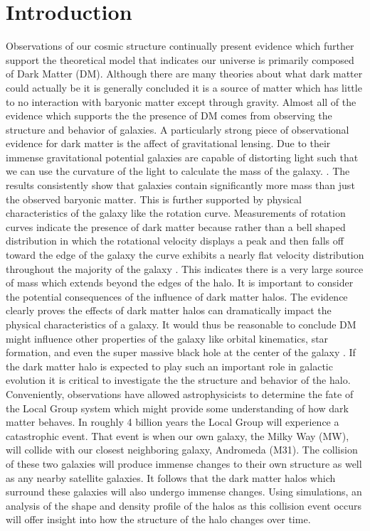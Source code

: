 \documentclass[usenatbib]{mnras}
\begin{document}
\section{Introduction}
Observations of our cosmic structure continually present evidence which further support the theoretical model that indicates our universe is primarily composed of Dark Matter (DM). Although there are many theories about what dark matter could actually be it is generally concluded it is a source of matter which has little to no interaction with baryonic matter except through gravity. Almost all of the evidence which supports the the presence of DM comes from observing the structure and behavior of galaxies. A particularly strong piece of observational evidence for dark matter is the affect of gravitational lensing. Due to their immense gravitational potential galaxies are capable of distorting light such that we can use the curvature of the light to calculate the mass of the galaxy. \citep{Massey_2010}. The results consistently show that galaxies contain significantly more mass than just the observed baryonic matter. This is further supported by physical characteristics of the galaxy like the rotation curve. Measurements of rotation curves indicate the presence of dark matter because rather than a bell shaped distribution in which the rotational velocity displays a peak and then falls off toward the edge of the galaxy the curve exhibits a nearly flat velocity distribution throughout the majority of the galaxy \citep{Hoeneisen19}. This indicates there is a very large source of mass which extends beyond the edges of the halo. It is important to consider the potential consequences of the influence of dark matter halos. The evidence clearly proves the effects of dark matter halos can dramatically impact the physical characteristics of a galaxy. It would thus be reasonable to conclude DM might influence other properties of the galaxy like orbital kinematics, star formation, and even the super massive black hole at the center of the galaxy \citep{Springel05}. If the dark matter halo is expected to play such an important role in galactic evolution it is critical to investigate the the structure and behavior of the halo. Conveniently, observations have allowed astrophysicists to determine the fate of the Local Group system which might provide some understanding of how dark matter behaves. In roughly 4 billion years the Local Group will experience a catastrophic event. That event is when our own galaxy, the Milky Way (MW), will collide with our closest neighboring galaxy, Andromeda (M31). The collision of these two galaxies will produce immense changes to their own structure as well as any nearby satellite galaxies. It follows that the dark matter halos which surround these galaxies will also undergo immense changes. Using simulations, an analysis of the shape and density profile of the halos as this collision event occurs will offer insight into how the structure of the halo changes over time. 
\end{document}
